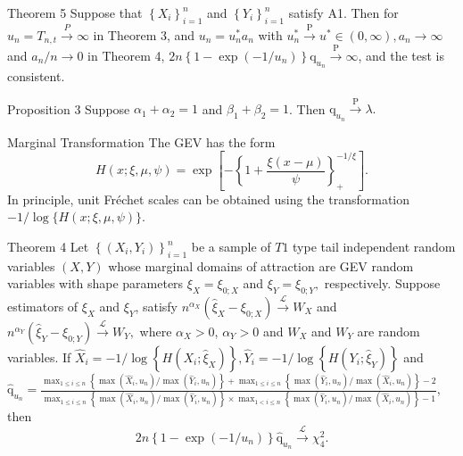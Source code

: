 \documentclass[12pt]{beamer}
\begin{document}
\begin{frame}{Theorem 5}
Suppose that $\left\{X_{i}\right\}_{i=1}^{n}$ and $\left\{Y_{i}\right\}_{i=1}^{n}$ satisfy A1. Then for $u_n=T_{n,t}\stackrel{P}{\to} \infty$ in Theorem 3, and $u_{n}=u_{n}^{*} a_{n}$ with $u_{n}^{*} \stackrel{\mathrm{P}}{\rightarrow} u^{*} \in(0, \infty), a_{n} \rightarrow \infty$ and
$a_n/n\to 0$ in Theorem 4, $2 n\left\{1-\exp \left(-1 / u_{n}\right)\right\} \mathrm{q}_{u_{n}} \stackrel{\mathrm{P}}{\rightarrow} \infty$, and the test is consistent.
\end{frame}

\begin{frame}{Proposition 3}
Suppose $\alpha_{1}+\alpha_{2}=1$ and $\beta_{1}+\beta_{2}=1$. Then $\mathrm{q}_{u_{n}} \stackrel{\mathrm{P}}{\rightarrow} \lambda.$
\end{frame}

\begin{frame}{Marginal Transformation}
The GEV has the form
\begin{displaymath}
H(x ; \xi, \mu, \psi)=\exp \left[-\left\{1+\frac{\xi(x-\mu)}{\psi}\right\}_{+}^{-1 / \xi}\right].
\end{displaymath}
In principle, unit Fréchet scales can be obtained using the transformation $-1 / \log \{H(x ; \xi, \mu, \psi)\}.$
\end{frame}



\begin{frame}{Theorem 4}
Let $\left\{\left(X_{i}, Y_{i}\right)\right\}_{i=1}^{n}$ be a sample of $T1$ type tail independent random variables $(X,Y)$ whose marginal domains of attraction are GEV random variables with shape parameters $\xi_{X}=\xi_{0 ; X}$ and $\xi_{Y}=\xi_{0 ; Y},$ respectively. Suppose estimators of $\xi_{X}$ and $\xi_{Y}$, satisfy $n^{\alpha_{X}}\left(\hat{\xi}_{X}-\xi_{0 ; X}\right) \stackrel{\mathcal{L}}{\rightarrow} W_{X}$ and $n^{\alpha_{Y}}\left(\hat{\xi}_{Y}-\xi_{0 ; Y}\right) \stackrel{\mathcal{L}}{\rightarrow} W_{Y},$ where $\alpha_{X}>0$, $\alpha_{Y}>0$ and $W_{X}$ and $W_{Y}$ are random variables. If $\hat{X}_{i}=-1 / \log \left\{H\left(X_{i} ; \hat{\xi}_{X}\right)\right\}, \hat{Y}_{i}=-1 / \log \left\{H\left(Y_{i} ; \hat{\xi}_{Y}\right)\right\}$ and
$\hat{\mathrm{q}}_{u_{n}}=\frac{\max _{1 \leq i \leq n}\left\{\max \left(\hat{X}_{i}, u_{n}\right) / \max \left(\hat{Y}_{i}, u_{n}\right)\right\}+\max _{1 \leq i \leq n}\left\{\max \left(\hat{Y}_{i}, u_{n}\right) / \max \left(\hat{X}_{i}, u_{n}\right)\right\}-2}{\max _{1 \leq i \leq n}\left\{\max \left(\hat{X}_{i}, u_{n}\right) / \max \left(\hat{Y}_{i}, u_{n}\right)\right\} \times \max _{1<i \leq n}\left\{\max \left(\hat{Y}_{i}, u_{n}\right) / \max \left(\hat{X}_{i}, u_{n}\right)\right\}-1}$, then
$$ 2 n\left\{1-\exp \left(-1 / u_{n}\right)\right\} \hat{\mathrm{q}}_{u_{n}} \stackrel{\mathcal{L}}{\rightarrow} \chi_{4}^{2}.$$
\end{frame}
\end{document}
